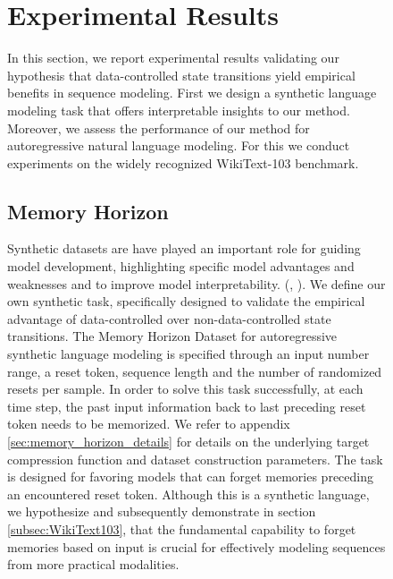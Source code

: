 \documentclass{article} \usepackage{iclr2024_conference,times}
\begin{document}
\begin{figure}[H]
\begin{minipage}{0.6\textwidth}
\section{Experimental Results}\label{sec:experiments}

In this section, we report experimental results validating our hypothesis that data-controlled state transitions yield empirical benefits in sequence modeling. First we design a synthetic language modeling task that offers interpretable insights to our method. Moreover, we assess the performance of our method for autoregressive natural language modeling. For this we conduct experiments on the widely recognized WikiText-103 benchmark.

\subsection{Memory Horizon}

Synthetic datasets are have played an important role for guiding model development, highlighting specific model advantages and weaknesses and to improve model interpretability. (\cite{olsson2022incontext}, \cite{fu2023hungry}). We define our own synthetic task, specifically designed to validate the empirical advantage of data-controlled over non-data-controlled state transitions. The Memory Horizon Dataset for autoregressive synthetic language modeling is specified through an input number range, a reset token, sequence length and the number of randomized resets per sample. In order to solve this task successfully, at each time step, the past input information back to last preceding reset token needs to be memorized. We refer to appendix \ref{sec:memory_horizon_details} for details on the underlying target compression function and dataset construction parameters. The task is designed for favoring models that can forget memories preceding an encountered reset token. Although this is a synthetic language, we hypothesize and subsequently demonstrate in section \ref{subsec:WikiText103}, that the fundamental capability to forget memories based on input is crucial for effectively modeling sequences from more practical modalities.



\end{minipage}
\end{figure}
\end{document}
